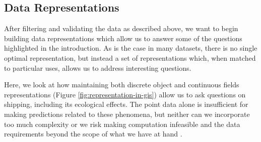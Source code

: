 \subsection{Data Representations}


After filtering and validating the data as described above, we want to begin building data representations which allow us to answer some of the questions highlighted in the introduction. As is the case in many datasets, there is no single optimal representation, but instead a set of representations which, when matched to particular uses, allows us to address interesting questions.

Here, we look at how maintaining both discrete object and continuous fields representations (Figure \ref{fig:representation-in-gis}) allow us to ask questions on shipping, including its ecological effects. The point data alone is insufficient for making predictions related to these phenomena, but neither can we incorporate too much complexity or we risk making computation infeasible and the data requirements beyond the scope of what we have at hand \citep{de2007geospatial}.




